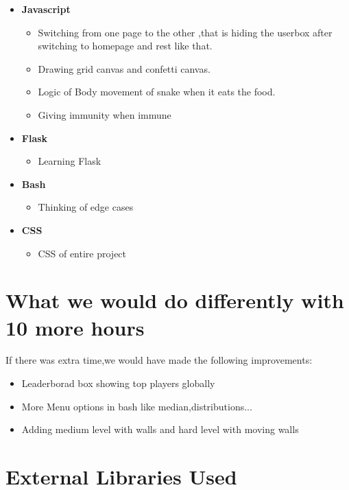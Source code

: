 \documentclass[12pt]{article}
\begin{document}
\begin{itemize}
    \item \textbf{Javascript}
    \begin{itemize}
    \item Switching from one  page to the other ,that is hiding the userbox after switching to homepage and rest like that.
    \item Drawing  grid canvas and confetti canvas. 
    \item Logic of Body movement of snake when it eats the food.
    \item Giving immunity when immune
    \end{itemize}
    \item \textbf{Flask}
    \begin{itemize}
    \item Learning Flask
    \end{itemize}
    \item \textbf{Bash}
    \begin{itemize}
    \item Thinking of edge cases
    \end{itemize}
    \item \textbf{CSS}
    \begin{itemize}
    \item CSS of entire project
    \end{itemize}
\end{itemize}




\section{What we would do differently with 10 more hours}
If there was extra time,we would have made the following improvements:

\begin{itemize}
    \item Leaderborad box showing top players globally
    \item More Menu options in bash like median,distributions...
    \item Adding medium level with walls and hard level with moving walls
\end{itemize}

\section{External Libraries Used}
\end{document}

